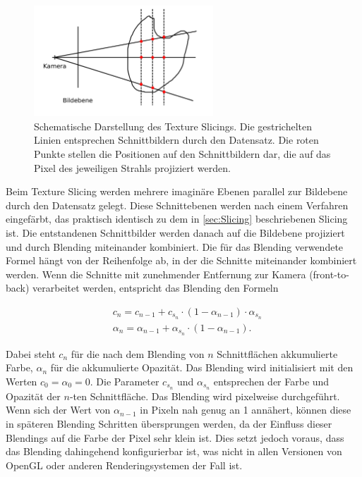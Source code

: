 \documentclass[a4paper,fontsize=12pt,toc=bib,parskip=half,ngerman]{scrartcl}
\begin{document}
\begin{figure}
	\centering
	\includegraphics[width=0.6\textwidth]{pictures/Texture_Slicing}
	\caption{Schematische Darstellung des Texture Slicings. Die gestrichelten Linien entsprechen Schnittbildern durch den Datensatz. Die roten Punkte stellen die Positionen auf den Schnittbildern dar, die auf das Pixel des jeweiligen Strahls projiziert werden.}
	\label{TextureSlicing}
\end{figure}

Beim Texture Slicing werden mehrere imagin\"are Ebenen parallel zur Bildebene durch den Datensatz gelegt. Diese Schnittebenen werden nach einem Verfahren eingef\"arbt, das praktisch identisch zu dem in \cref{sec:Slicing} beschriebenen Slicing ist. Die entstandenen Schnittbilder werden danach auf die Bildebene projiziert und durch Blending miteinander kombiniert. Die f\"ur das Blending verwendete Formel h\"angt von der Reihenfolge ab, in der die Schnitte miteinander kombiniert werden. Wenn die Schnitte mit zunehmender Entfernung zur Kamera (front-to-back) verarbeitet werden, entspricht das Blending den Formeln

\begin{align}
&c_n = c_{n-1} + c_{s_n}\cdot(1-\alpha_{n-1})\cdot\alpha_{s_n}
\label{front-to-back-color}\\ 
&\alpha_n = \alpha_{n-1} + \alpha_{s_n}\cdot(1-\alpha_{n-1}).
\label{front-to-back-alpha}
\end{align}

Dabei steht $c_n$ f\"ur die nach dem Blending von $n$ Schnittfl\"achen akkumulierte Farbe, $\alpha_n$ f\"ur die akkumulierte Opazit\"at. Das Blending wird initialisiert mit den Werten $c_0 = \alpha_0 = 0$. Die Parameter $c_{s_n}$ und $\alpha_{s_n}$ entsprechen der Farbe und Opazit\"at der $n$-ten Schnittfl\"ache. Das Blending wird pixelweise durchgef\"uhrt. Wenn sich der Wert von $\alpha_{n-1}$ in Pixeln nah genug an 1 ann\"ahert, k\"onnen diese in sp\"ateren Blending Schritten \"ubersprungen werden, da der Einfluss dieser Blendings auf die Farbe der Pixel sehr klein ist. Dies setzt jedoch voraus, dass das Blending dahingehend konfigurierbar ist, was nicht in allen Versionen von OpenGL oder anderen Renderingsystemen der Fall ist. 
\end{document}
